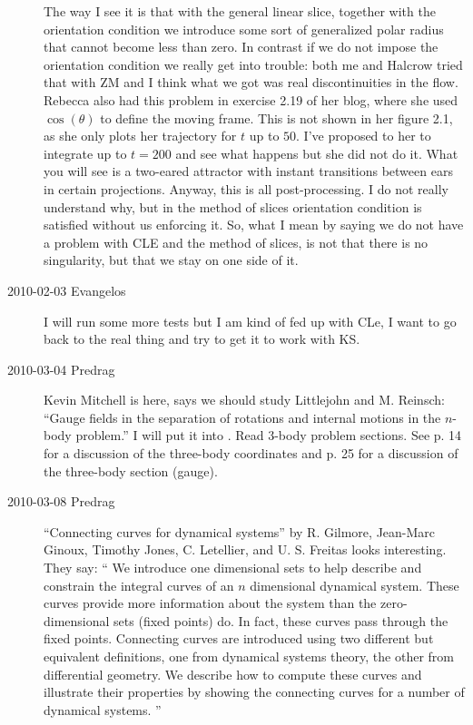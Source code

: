 \begin{description}
The way I see it is that with the general linear slice,
together with the orientation condition we introduce some
sort of generalized polar radius that cannot become less than
zero. In contrast if we do not impose the orientation
condition we really get into trouble: both me and Halcrow
tried that with ZM and I think what we got was real
discontinuities in the flow. Rebecca also had this problem in
exercise 2.19 of her blog, where she used $\cos(\theta)$ to
define the moving frame. This is not shown in her figure 2.1,
as she only plots her trajectory for $t$ up to $50$. I've
proposed to her to integrate up to $t=200$ and see what
happens but she did not do it. What you will see is a
two-eared attractor with instant transitions between ears in
certain projections. Anyway, this is all post-processing. I
do not really understand why, but in the method of slices
orientation condition is satisfied without us enforcing it.
So, what I mean by saying we do not have a problem with CLE
and the method of slices, is not that there is no
singularity, but that we stay on one side of it.

\item[2010-02-03 Evangelos] I will run some more tests but I am kind
of fed up with CLe, I want to go back to the real thing and try
to get it to work with KS.

\item[2010-03-04 Predrag]
Kevin Mitchell is here, says we should study Littlejohn and
M. Reinsch: ``Gauge fields in the separation of
rotations and internal motions in the $n$-body problem.'' I
will put it into . Read 3-body problem
sections. See p. 14 for a discussion of the three-body
coordinates and p. 25 for a discussion of the three-body
section (gauge).

\item[2010-03-08 Predrag]
``Connecting curves for dynamical systems'' by
R. Gilmore, Jean-Marc Ginoux, Timothy Jones, C. Letellier, and U. S.
 Freitas looks interesting. They say:
``
 We introduce one dimensional sets to help describe and constrain the integral
curves of an $n$ dimensional dynamical system. These curves provide more
information about the system than the zero-dimensional sets (fixed points) do.
In fact, these curves pass through the fixed points. Connecting curves are
introduced using two different but equivalent definitions, one from dynamical
systems theory, the other from differential geometry. We describe how to
compute these curves and illustrate their properties by showing the connecting
curves for a number of dynamical systems.
''



\end{description}
